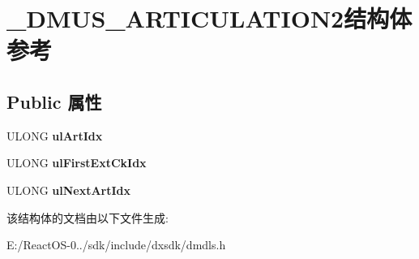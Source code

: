 \hypertarget{struct___d_m_u_s___a_r_t_i_c_u_l_a_t_i_o_n2}{}\section{\+\_\+\+D\+M\+U\+S\+\_\+\+A\+R\+T\+I\+C\+U\+L\+A\+T\+I\+O\+N2结构体 参考}
\label{struct___d_m_u_s___a_r_t_i_c_u_l_a_t_i_o_n2}
\subsection*{Public 属性}
\begin{DoxyCompactItemize}
\item 
\mbox{\label{struct___d_m_u_s___a_r_t_i_c_u_l_a_t_i_o_n2_a274a5a0e82d2c8325a83f7955c38caa7}} 
U\+L\+O\+NG {\bfseries ul\+Art\+Idx}
\item 
\mbox{\label{struct___d_m_u_s___a_r_t_i_c_u_l_a_t_i_o_n2_a46badc2f58d973bdad903097817949b3}} 
U\+L\+O\+NG {\bfseries ul\+First\+Ext\+Ck\+Idx}
\item 
\mbox{\label{struct___d_m_u_s___a_r_t_i_c_u_l_a_t_i_o_n2_a542396ff4ced5450d426d92fb918414a}} 
U\+L\+O\+NG {\bfseries ul\+Next\+Art\+Idx}
\end{DoxyCompactItemize}


该结构体的文档由以下文件生成\+:\begin{DoxyCompactItemize}
\item 
E\+:/\+React\+O\+S-\/0../sdk/include/dxsdk/dmdls.\+h\end{DoxyCompactItemize}
